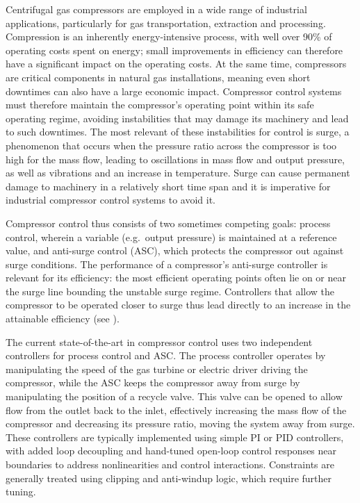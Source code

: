 Centrifugal gas compressors are employed in a wide range of industrial applications, particularly for gas transportation, extraction and processing.
Compression is an inherently energy-intensive process, with well over 90\% of operating costs spent on energy; small improvements in efficiency can therefore have a significant impact on the operating costs.
At the same time, compressors are critical components in natural gas installations, meaning even short downtimes can also have a large economic impact.
Compressor control systems must therefore maintain the compressor's operating point within its safe operating regime, avoiding instabilities that may damage its machinery and lead to such downtimes.
The most relevant of these instabilities for control is surge, a phenomenon that occurs when the pressure ratio across the compressor is too high for the mass flow, leading to oscillations in mass flow and output pressure, as well as vibrations and an increase in temperature.
Surge can cause permanent damage to machinery in a relatively short time span and it is imperative for industrial compressor control systems to avoid it.

Compressor control thus consists of two sometimes competing goals: process control, wherein a variable (e.g.\ output pressure) is maintained at a reference value, and anti-surge control (ASC), which protects the compressor out against surge conditions.
The performance of a compressor's anti-surge controller is relevant for its efficiency: the most efficient operating points often lie on or near the surge line bounding the unstable surge regime.
Controllers that allow the compressor to be operated closer to surge thus lead directly to an increase in the attainable efficiency (see \cite{Cortinovis2014}).

The current state-of-the-art in compressor control uses two independent controllers for process control and ASC\@.
The process controller operates by manipulating the speed of the gas turbine or electric driver driving the compressor, while the ASC keeps the compressor away from surge by manipulating the position of a recycle valve.
This valve can be opened to allow flow from the outlet back to the inlet, effectively increasing the mass flow of the compressor and decreasing its pressure ratio, moving the system away from surge.
These controllers are typically implemented using simple PI or PID controllers, with added loop decoupling and hand-tuned open-loop control responses near boundaries to address nonlinearities and control interactions.
Constraints are generally treated using clipping and anti-windup logic, which require further tuning.

